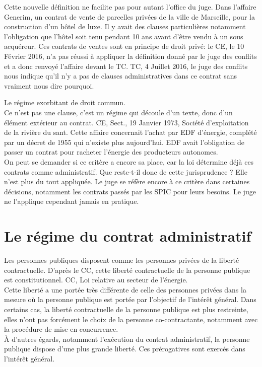 \documentclass[10pt, a4paper, openany]{book}
\begin{document}
Cette nouvelle définition ne facilite pas pour autant l'office du juge. Dans l'affaire Generim, un contrat de vente de parcelles privées de la ville de Marseille, pour la construction d'un hôtel de luxe. Il y avait des clauses particulières notamment l'obligation que l'hôtel soit tenu pendant 10 ans avant d'être vendu à un sous acquéreur. Ces contrats de ventes sont en principe de droit privé: le CE, le 10 Février 2016, n'a pas réussi à appliquer la définition donné par le juge des conflits et a donc renvoyé l'affaire devant le TC. TC, 4 Juillet 2016, le juge des conflits nous indique qu'il n'y a pas de clauses administratives dans ce contrat sans vraiment nous dire pourquoi. 


Le régime exorbitant de droit commun. \\
Ce n'est pas une clause, c'est un régime qui découle d'un texte, donc d'un élément extérieur au contrat. CE, Sect., 19 Janvier 1973, Société d'exploitation de la rivière du sant. Cette affaire concernait l'achat par EDF d'énergie, complété par un décret de 1955 qui n'existe plus aujourd'hui. EDF avait l'obligation de passer un contrat pour racheter l'énergie des producteurs autonomes. \\
On peut se demander si ce critère a encore sa place, car la loi détermine déjà ces contrats comme administratif. Que reste-t-il donc de cette jurisprudence ? Elle n'est plus du tout appliquée. Le juge se réfère encore à ce critère dans certaines décisions, notamment les contrats passés par les SPIC pour leurs besoins. Le juge ne l'applique cependant jamais en pratique. 

\chapter{Le régime du contrat administratif}

Les personnes publiques disposent comme les personnes privées de la liberté contractuelle. D'après le CC, cette liberté contractuelle de la personne publique est constitutionnel. CC, Loi relative au secteur de l'énergie. \\
Cette liberté a une portée très différente de celle des personnes privées dans la mesure où la personne publique est portée par l'objectif de l'intérêt général. Dans certains cas, la liberté contractuelle de la personne publique est plus restreinte, elles n'ont pas forcément le choix de la personne co-contractante, notamment avec la procédure de mise en concurrence. \\
À d'autres égards, notamment l'exécution du contrat administratif, la personne publique dispose d'une plus grande liberté. Ces prérogatives sont exercés dans l'intérêt général. 
\end{document}
